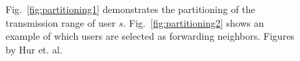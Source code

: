 \begin{figure}
\centering
{} \hspace{6mm}
\caption{\label{fig:partitioning}Fig.~\ref{fig:partitioning1} demonstrates the partitioning of the transmission range of user $s$. Fig.~\ref{fig:partitioning2} shows an example of which users are selected as forwarding neighbors. Figures by Hur et. al. \cite{dtc2}}
\end{figure}

